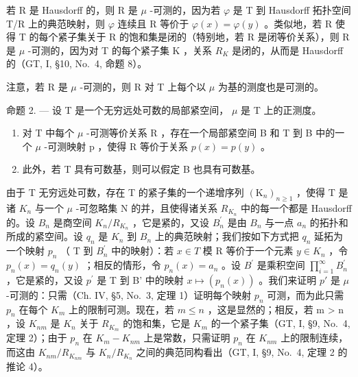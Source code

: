 若 R 是 Hausdorff 的，则 R 是 \(\mu\) -可测的，因为若 \(\varphi\) 是 T 到 Hausdorff 拓扑空间 T/R 上的典范映射，则 \(\varphi\) 连续且 R 等价于 \(\varphi(x)=\varphi(y)\) 。类似地，若 R 使得 T 的每个紧子集关于 R 的饱和集是闭的（特别地，若 R 是闭等价关系），则 R 是 \(\mu\) -可测的，因为对 T 的每个紧子集 K ，关系 \(R_{K}\) 是闭的，从而是 Hausdorff 的（GT, I, §10, No.~4, 命题 8）。

注意，若 R 是 \(\mu\) -可测的，则 R 对 T 上每个以 \(\mu\) 为基的测度也是可测的。

命题 2. --- 设 T 是一个无穷远处可数的局部紧空间， \(\mu\) 是 T 上的正测度。

\begin{enumerate}
\def\labelenumi{\arabic{enumi})}
\item
  对 T 中每个 \(\mu\) -可测等价关系 R ，存在一个局部紧空间 B 和 T 到 B 中的一个 \(\mu\) -可测映射 p ，使得 R 等价于关系 \(p(x) = p(y)\) 。
\item
  此外，若 T 具有可数基，则可以假定 B 也具有可数基。
\end{enumerate}

由于 T 无穷远处可数，存在 T 的紧子集的一个递增序列 \((\mathrm{K}_{n})_{n\geqslant1}\) ，使得 T 是诸 \(K_{n}\) 与一个 \(\mu\) -可忽略集 N 的并，且使得诸关系 \(R_{K_{n}}\) 中的每一个都是 Hausdorff 的。设 \(B_{n}\) 是商空间 \(K_{n}/R_{K_{n}}\) ，它是紧的，又设 \(B_{n}^{\prime}\) 是由 \(B_{n}\) 与一点 \(a_{n}\) 的拓扑和所成的紧空间。设 \(q_{n}\) 是 \(K_{n}\) 到 \(B_{n}\) 上的典范映射；我们按如下方式把 \(q_{n}\) 延拓为一个映射 \(p_{n}\) （ T 到 \(B_{n}^{\prime}\) 中的映射）：若 \(x\in T\) 模 R 等价于一个元素 \(y\in K_{n}\) ，令 \(p_{n}(x)=q_{n}(y)\) ；相反的情形，令 \(p_{n}(x)=a_{n}\) 。设 \(B^{\prime}\) 是乘积空间 \(\prod_{i=1}^{\infty}B_{n}^{\prime}\) ，它是紧的，又设 \(p^{\prime}\) 是 T 到 B' 中的映射 \(x \mapsto (p_n(x))\) 。我们来证明 \(p'\) 是 \(\mu\) -可测的：只需（Ch. IV, §5, No.~3, 定理 1）证明每个映射 \(p_n\) 可测，而为此只需 \(p_n\) 在每个 \(K_m\) 上的限制可测。现在，若 \(m \leqslant n\) ，这是显然的；相反，若 m \textgreater{} n ，设 \(K_{nm}\) 是 \(K_n\) 关于 \(R_{K_m}\) 的饱和集，它是 \(K_m\) 的一个紧子集（GT, I, §9, No.~4, 定理 2）；由于 \(p_n\) 在 \(K_m - K_{nm}\) 上是常数，只需证明 \(p_n\) 在 \(K_{nm}\) 上的限制连续，而这由 \(K_{nm}/R_{K_{nm}}\) 与 \(K_n/R_{K_n}\) 之间的典范同构看出（GT, I, §9, No.~4, 定理 2 的推论 4）。

